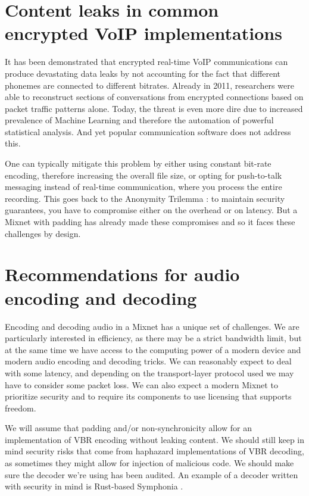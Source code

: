 \documentclass{article}
\begin{document}
\pagebreak
\section{Content leaks in common encrypted VoIP implementations}
It has been demonstrated that encrypted real-time VoIP communications can produce devastating data leaks by not accounting for the fact that different phonemes are connected to different bitrates. Already in 2011, researchers were able to reconstruct sections of conversations from encrypted connections based on packet traffic patterns alone. \cite{phonemes}  Today, the threat is even more dire due to increased prevalence of Machine Learning and therefore the automation of powerful statistical analysis. \cite{phonemesdl} And yet popular communication software does not address this.

One can typically mitigate this problem by either using constant bit-rate encoding, therefore increasing the overall file size, or opting for push-to-talk messaging instead of real-time communication, where you process the entire recording. This goes back to the Anonymity Trilemma \cite{trilemma}: to maintain security guarantees, you have to compromise either on the overhead or on latency. But a Mixnet with padding has already made these compromises and so it faces these challenges by design.

\section{Recommendations for audio encoding and decoding}

Encoding and decoding  audio in a Mixnet has a unique set of challenges. We are particularly interested in efficiency, as there may be a strict bandwidth limit, but at the same time we have access to the computing power of a modern device and modern audio encoding and decoding tricks. We can reasonably expect to deal with some latency, and depending on the transport-layer protocol used we may have to consider some packet loss. We can also expect a modern Mixnet to prioritize security and to require its components to use licensing that supports freedom.

We will assume that padding and/or non-synchronicity allow for an implementation of VBR encoding without leaking content. We should still keep in mind security risks that come from haphazard implementations of VBR decoding, as sometimes they might allow for injection of malicious code. We should make sure the decoder we're using has been audited. An example of a decoder written with security in mind is Rust-based Symphonia \cite{symphonia}.
\end{document}
